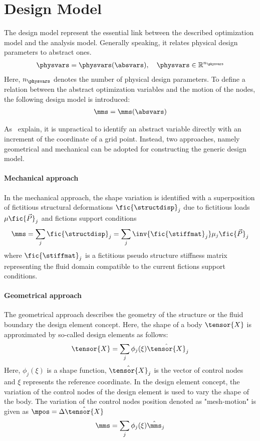\documentclass[../main.tex]{subfiles}
\begin{document}
%
\section{Design Model}\label{sec:design_model}
The design model represent the essential link between the described optimization model and the analysis model. Generally speaking, it relates physical design parameters to abstract ones.
\begin{align}
\physvars=\physvars(\absvars),~~~\physvars \in \mathbb{R}^{n_{\physvars}} \label{eq:physvarsTOabsvars}
\end{align}
Here, $n_{\physvars}$ denotes the number of physical design parameters.
To define a relation between the abstract optimization variables and the motion of the nodes, the following design model is introduced:
\begin{align}
\mms=\mms(\absvars)
\end{align}

As~\cite{Maute2001} explain, it is unpractical to identify an abstract variable directly with an increment of the coordinate of a grid point. Instead, two approaches, namely geometrical and mechanical can be adopted for constructing the generic design model.
\paragraph{Mechanical approach}
In the mechanical approach, the shape variation is identified with a superposition of fictitious structural deformations $\fic{\structdisp}_{j}$ due to fictitious loads $\mu \fic{\vec{P}}_{j}$ and fictions support conditions
\begin{align}
\mms=\sum_j \fic{\structdisp}_j = \sum_j \inv{\fic{\stiffmat}_j} \mu_j \fic{\vec{P}}_{j} \label{eq:mechanical_approach}
\end{align}
where $\fic{\stiffmat}_j$ is a fictitious pseudo structure stiffness matrix representing the fluid domain compatible to the current fictions support conditions.

\paragraph{Geometrical approach}
The geometrical approach describes the geometry of the structure or the fluid boundary the design element concept. Here, the shape of a body $\tensor{X}$ is approximated by so-called design elements as follows:
\begin{align}
\tensor{X}=\sum_{j} \phi_{j}(\xi) \hat{\tensor{X}}_j \label{eq:geometrical_approach}
\end{align}
Here, $\phi_{j}(\xi)$ is a shape function, $\hat{\tensor{X}}_j$ is the vector of control nodes and $\xi$ represents the reference coordinate. In the design element concept, the variation of the control nodes of the design element is used to vary the shape of the body. The variation of the control nodes position denoted as "mesh-motion" is given as $\mpos=\Delta \hat{\tensor{X}} $
\begin{align}
\mms = \sum_j \phi_{j}(\xi) \hat{\mms}_j \label{eq:mms}
\end{align}
\end{document}
